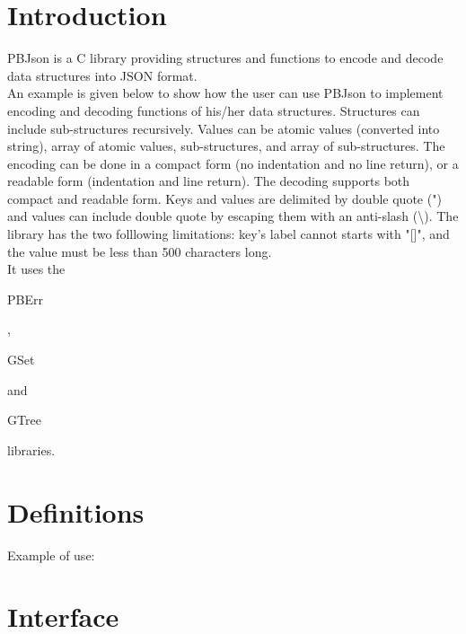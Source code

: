 \section*{Introduction}

PBJson is a C library providing structures and functions to encode and decode data structures into JSON format.\\ 

An example is given below to show how the user can use PBJson to implement encoding and decoding functions of his/her data structures. Structures can include sub-structures recursively. Values can be atomic values (converted into string), array of atomic values, sub-structures, and array of sub-structures. The encoding can be done in a compact form (no indentation and no line return), or a readable form (indentation and line return). The decoding supports both compact and readable form. Keys and values are delimited by double quote (") and values can include double quote by escaping them with an anti-slash (\textbackslash). The library has the two folllowing limitations: key's label cannot starts with "[]", and the value must be less than 500 characters long. \\

It uses the \begin{ttfamily}PBErr\end{ttfamily}, \begin{ttfamily}GSet\end{ttfamily} and \begin{ttfamily}GTree\end{ttfamily} libraries.\\

\section{Definitions}

Example of use:\\

\begin{scriptsize}
\begin{ttfamily}

\end{ttfamily}
\end{scriptsize}

\section{Interface}

